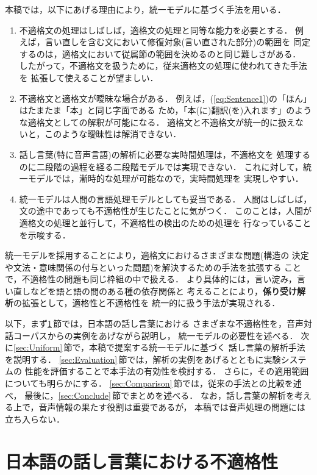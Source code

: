 本稿では，以下にあげる理由により，統一モデルに基づく手法を用いる．
\begin{enumerate}
\renewcommand{\theenumi}{}
\renewcommand{\labelenumi}{}
  \item 不適格文の処理はしばしば，適格文の処理と同等な能力を必要とする．
例えば，言い直しを含む文において修復対象(言い直された部分)の範囲を
同定するのは，適格文において従属節の範囲を決めるのと同じ難しさがある．
したがって，不適格文を扱うために，従来適格文の処理に使われてきた手法を
拡張して使えることが望ましい．
  \item 不適格文と適格文が曖昧な場合がある．
例えば，(\ref{eq:Sentence1})の「ほん」はたまたま「本」と同じ字面である
ため，「本(に)翻訳(を)入れます」のような適格文としての解釈が可能になる．
適格文と不適格文が統一的に扱えないと，このような曖昧性は解消できない．
  \item 話し言葉(特に音声言語)の解析に必要な実時間処理は，不適格文を
処理するのに二段階の過程を経る二段階モデルでは実現できない．
これに対して，統一モデルでは，漸時的な処理が可能なので，実時間処理を
実現しやすい．
  \item 統一モデルは人間の言語処理モデルとしても妥当である．
人間はしばしば，文の途中であっても不適格性が生じたことに気がつく．
このことは，人間が適格文の処理と並行して，不適格性の検出のための処理を
行なっていることを示唆する．
\end{enumerate}

統一モデルを採用することにより，適格文におけるさまざまな問題(構造の
決定や文法・意味関係の付与といった問題)を解決するための手法を拡張する
ことで，不適格性の問題も同じ枠組の中で扱える．
より具体的には，言い淀み，言い直しなどを語と語の間のある種の依存関係と
考えることにより，{\bf 係り受け解析}の拡張として，適格性と不適格性を
統一的に扱う手法が実現される．

以下，まず\ref{sec:Ill-formed}\,節では，日本語の話し言葉における
さまざまな不適格性を，音声対話コーパスからの実例をあげながら説明し，
統一モデルの必要性を述べる．
次に\ref{sec:Uniform}\,節で，本稿で提案する統一モデルに基づく
話し言葉の解析手法を説明する．
\ref{sec:Evaluation}\,節では，解析の実例をあげるとともに実験システムの
性能を評価することで本手法の有効性を検討する．
さらに，その適用範囲についても明らかにする．
\ref{sec:Comparison}\,節では，従来の手法との比較を述べ，
最後に，\ref{sec:Conclude}\,節でまとめを述べる．
なお，話し言葉の解析を考える上で，音声情報の果たす役割は重要であるが，
本稿では音声処理の問題には立ち入らない．
\section{日本語の話し言葉における不適格性}\label{sec:Ill-formed}

